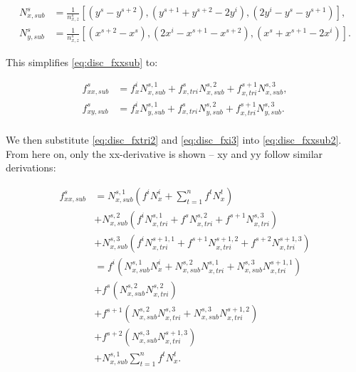 \documentclass{article}
\begin{document}
\begin{equation} \label{eq:disc_Nxsub}
\begin{split}
N_{x,sub}^s &= \frac{1}{n_{x,z}^s} \left[ (y^s - y^{s+2}), (y^{s+1} + y^{s+2} - 2y^i), (2y^i - y^s - y^{s+1}) \right], \\
N_{y,sub}^s &= \frac{1}{n_{x,z}^s} \left[ (x^{s+2} - x^s), (2x^i - x^{s+1} - x^{s+2}), (x^s + x^{s+1} - 2x^i) \right].
\end{split}
\end{equation}

This simplifies \eqref{eq:disc_fxxsub} to:

\begin{equation} \label{eq:disc_fxxsub2}
\begin{split}
f_{xx,sub}^s &= f_x^i N_{x,sub}^{s,1} + f_{x,tri}^s N_{x,sub}^{s,2} + f_{x,tri}^{s+1} N_{x,sub}^{s,3}, \\
f_{xy,sub}^s &= f_x^i N_{y,sub}^{s,1} + f_{x,tri}^s N_{y,sub}^{s,2} + f_{x,tri}^{s+1} N_{y,sub}^{s,3}. \\
\end{split}
\end{equation}

We then substitute \eqref{eq:disc_fxtri2} and \eqref{eq:disc_fxi3} into \eqref{eq:disc_fxxsub2}. From here on, only the xx-derivative is shown – xy and yy follow similar derivations:

\begin{equation} \label{eq:disc_fxxsub3}
\begin{split}
f_{xx,sub}^s &= N_{x,sub}^{s,1} \left( f^i N_x^i + \sum_{t=1}^n f^t N_x^t \right) \\
     & + N_{x,sub}^{s,2} \left( f^i N_{x,tri}^{s,1} + f^s N_{x,tri}^{s,2} + f^{s+1} N_{x,tri}^{s,3} \right) \\ 
     & + N_{x,sub}^{s,3} \left( f^i N_{x,tri}^{s+1,1} + f^{s+1} N_{x,tri}^{s+1,2} + f^{s+2} N_{x,tri}^{s+1,3} \right) \\
     &= f^i \left( N_{x,sub}^{s,1} N_x^i + N_{x,sub}^{s,2} N_{x,tri}^{s,1} + N_{x,sub}^{s,3} N_{x,tri}^{s+1,1} \right) \\
     & + f^s \left( N_{x,sub}^{s,2} N_{x,tri}^{s,2} \right) \\
     & + f^{s+1} \left( N_{x,sub}^{s,2} N_{x,tri}^{s,3} + N_{x,sub}^{s,3} N_{x,tri}^{s+1,2} \right) \\
     & + f^{s+2} \left( N_{x,sub}^{s,3} N_{x,tri}^{s+1,3} \right) \\
     & + N_{x,sub}^{s,1} \sum_{t=1}^n f^t N_x^t.
\end{split}
\end{equation}
\end{document}
